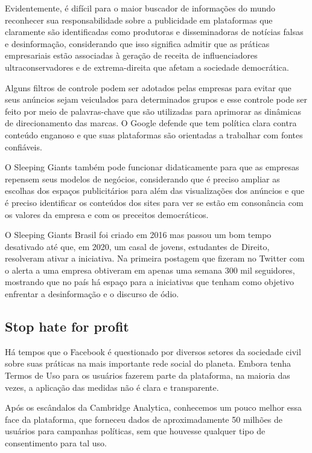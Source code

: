 Evidentemente, é difícil para o maior buscador de informações do mundo
reconhecer sua responsabilidade sobre a publicidade em plataformas que
claramente são identificadas como produtoras e disseminadoras de
notícias falsas e desinformação, considerando que isso significa admitir que
as práticas empresariais estão associadas à geração de receita de
influenciadores ultraconservadores e de extrema-direita que afetam a
sociedade democrática.

Alguns filtros de controle podem ser adotados pelas empresas para evitar
que seus anúncios sejam veiculados para determinados grupos e esse
controle pode ser feito por meio de palavras-chave que são utilizadas
para aprimorar as dinâmicas de direcionamento das marcas. O Google
defende que tem política clara contra conteúdo enganoso e que suas
plataformas são orientadas a trabalhar com fontes confiáveis.

O Sleeping Giants também pode funcionar didaticamente para que as
empresas repensem seus modelos de negócios, considerando que é preciso
ampliar as escolhas dos espaços publicitários para além das
visualizações dos anúncios e que é preciso identificar os conteúdos dos
sites para ver se estão em consonância com os valores da empresa e com
os preceitos democráticos.

O Sleeping Giants Brasil foi criado em 2016 mas passou um bom tempo
desativado até que, em 2020, um casal de jovens, estudantes de Direito,
resolveram ativar a iniciativa. Na primeira postagem que fizeram no
Twitter com o alerta a uma empresa obtiveram em apenas uma semana 300
mil seguidores, mostrando que no país há espaço para a iniciativas que
tenham como objetivo enfrentar a desinformação e o discurso de ódio.

\subsection{Stop hate for profit}

Há tempos que o Facebook é questionado por diversos setores da sociedade
civil sobre suas práticas na mais importante rede social do planeta.
Embora tenha Termos de Uso para os usuários fazerem parte da plataforma,
na maioria das vezes, a aplicação das medidas não é clara e
transparente.

Após os escândalos da Cambridge Analytica, conhecemos um pouco melhor
essa face da plataforma, que forneceu dados de aproximadamente 50
milhões de usuários para campanhas políticas, sem que houvesse qualquer
tipo de consentimento para tal uso.

